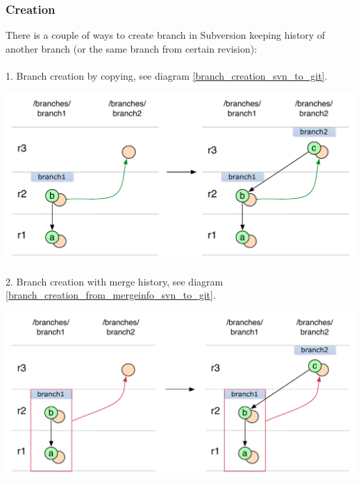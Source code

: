 \subsubsection{Creation}

There is a couple of ways to create branch in Subversion keeping history of another branch (or the same branch from certain revision):
\\\\
1. Branch creation by copying, see diagram \ref{branch_creation_svn_to_git}.
\begin{center}
\includegraphics[width=\textwidth]{img/diagrams/branch_creation_svn_to_git.pdf}%
\label{branch_creation_svn_to_git}%
\end{center}

2. Branch creation with merge history, see diagram \ref{branch_creation_from_mergeinfo_svn_to_git}.
\begin{center}
\includegraphics[width=\textwidth]{img/diagrams/branch_creation_from_mergeinfo_svn_to_git.pdf}%
\label{branch_creation_from_mergeinfo_svn_to_git}%
\end{center}

